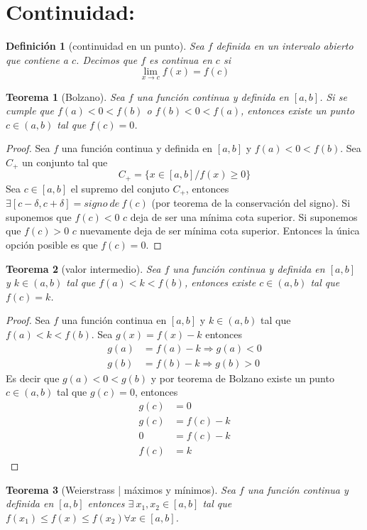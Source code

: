 \documentclass{article}
\newtheorem*{theorem}{Teorema}
\newtheorem*{definition}{Definición}
\begin{document}
  \section*{Continuidad:}
    \begin{definition}[continuidad en un punto]
      Sea $f$ definida en un intervalo abierto que contiene a $c$. Decimos que $f$ es 
      continua en $c$ si
      \begin{equation*}
        \lim_{x\to c}f(x)=f(c)
      \end{equation*}
    \end{definition}
    \begin{theorem}[Bolzano]
      Sea $f$ una función continua y definida en $[a,b]$. Si se cumple que $f(a)<0<f(b)$ o 
      $f(b)<0<f(a)$, entonces existe un punto $c\in(a,b)$ tal que $f(c)=0$.
    \end{theorem}
    \begin{proof}
      Sea $f$ una función continua y definida en $[a,b]$ y $f(a)<0<f(b)$. Sea $C_+$ un
      conjunto tal que
      \begin{equation*}
        C_+=\{x\in[a,b]/f(x)\geqslant0\}
      \end{equation*}
      Sea $c\in[a,b]$ el supremo del conjuto $C_+$, entonces $\exists[c-\delta,c+\delta]=
      signo\ de\ f(c)$ (por teorema de la conservación del signo). Si suponemos que $f(c)<0$
      $c$ deja de ser una mínima cota superior. Si suponemos que $f(c)>0$ $c$ nuevamente deja
      de ser mínima cota superior. Entonces la única opción posible es que $f(c)=0$.
    \end{proof}
    
    \begin{theorem}[valor intermedio]
      Sea $f$ una función continua y definida en $[a,b]$ y $k\in(a,b)$ tal que $f(a)<k<f(b)$,
      entonces existe $c\in(a,b)$ tal que $f(c)=k$.
    \end{theorem}
    \begin{proof}
      Sea $f$ una función continua en $[a,b]$ y $k\in(a,b)$ tal que $f(a)<k<f(b)$. Sea
      $g(x)=f(x)-k$ entonces
      \begin{align*}
        g(a)&=f(a)-k\Longrightarrow g(a)<0\\
        g(b)&=f(b)-k\Longrightarrow g(b)>0
      \end{align*}
      Es decir que $g(a)<0<g(b)$ y por teorema de Bolzano existe un punto 
      $c\in(a,b)$ tal que $g(c)=0$, entonces
      \begin{align*}
        g(c)&=0\\
        g(c)&=f(c)-k\\
        0&=f(c)-k\\
        f(c)&=k
      \end{align*}
    \end{proof}
    \begin{theorem}[Weierstrass | máximos y mínimos]
      Sea $f$ una función continua y definida en $[a,b]$ entonces $\exists\ x_1,x_2\in[a,b]$ 
      tal que $f(x_1)\leqslant f(x)\leqslant f(x_2)\forall x\in[a,b]$.
    \end{theorem}
    \newpage
\end{document}
